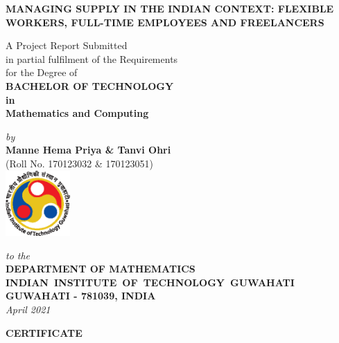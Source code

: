 \documentclass[12pt,a4wide]{report}
\theoremstyle{plain}
\theoremstyle{definition}
\theoremstyle{remark}
\begin{document}

\begin{titlepage}
\enlargethispage{3cm}

\begin{center}

\vspace*{-2cm}

\textbf{\Large MANAGING SUPPLY IN THE INDIAN CONTEXT:
FLEXIBLE WORKERS, FULL-TIME EMPLOYEES AND FREELANCERS}

\vfill

 A Project Report Submitted \\
  in partial fulfilment of the Requirements  \\
  for the Degree of\\[10pt]

 {\Large \bf BACHELOR OF TECHNOLOGY}\\
 {\bf in}\\
 {\bf Mathematics and Computing}\\ [5pt]

 \vfill

{\large \emph{by}}\\[5pt]
{\large\bf {Manne Hema Priya \& Tanvi Ohri}}\\[5pt]
{\large (Roll No. 170123032 \& 170123051) }\\[5pt]
\vfill
\includegraphics[height=2.5cm]{iitglogo.eps}

\vspace*{0.5cm}

{\em\large to the}\\[10pt]
{\bf\large DEPARTMENT OF MATHEMATICS} \\[5pt]
{\bf\large \mbox{INDIAN INSTITUTE OF TECHNOLOGY GUWAHATI}}\\[5pt]
{\bf\large GUWAHATI - 781039, INDIA}\\[10pt]
{\it\large April 2021}
\end{center}

\end{titlepage}

\clearpage

 \setcounter{page}{2}
\begin{center}
{\Large{\bf{CERTIFICATE}}}
\end{center}
\end{document}
